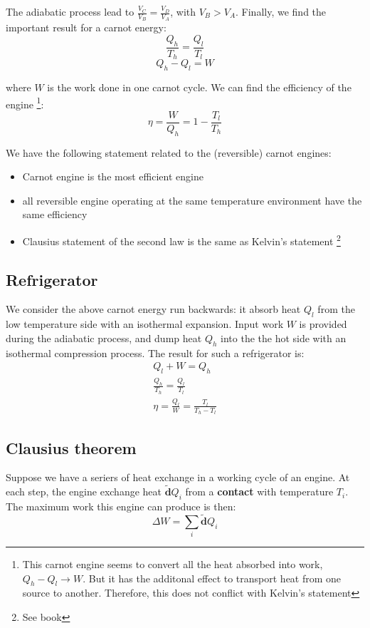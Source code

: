 \documentclass{article}
\newcommand{\dbar}{\mathbf{\tilde{d}}}
\begin{document}
The adiabatic process lead to $\frac{V_C}{V_B} = \frac{V_D}{V_A} $, with $V_B > V_A$. Finally, we 
find the important result for a carnot energy:
\[\boxed{\frac{Q_h}{T_h} = \frac{Q_l}{T_l} }\]
\begin{equation}
    Q_h - Q_l = W 
\end{equation}

where $W$ is the work done in one carnot cycle. We can find the efficiency of the engine
\footnote{This carnot engine seems to convert all the heat absorbed into work, $Q_h - Q_l \to W$. But
it has the additonal effect to transport heat from one source to another. Therefore, this does not 
conflict with Kelvin's statement}:
\begin{equation}
    \eta = \frac{W}{Q_h} = 1 - \frac{T_l}{T_h}
\end{equation}

We have the following statement related to the (reversible) carnot engines:
\begin{itemize}
    \item Carnot engine is the most efficient engine
    \item all reversible engine operating at the same temperature environment have the same efficiency
    \item Clausius statement of the second law is the same as Kelvin's statement \footnote{See book}
\end{itemize}

\subsection{Refrigerator}
We consider the above carnot energy run backwards: it absorb heat $Q_l$ from the 
low temperature side with an isothermal expansion. Input work $W$ is provided 
during the adiabatic process, and dump heat $Q_h$ into the the hot side 
with an isothermal compression process. The result for such a refrigerator is:
\begin{gather}
    Q_l + W = Q_h \\
    \frac{Q_h}{T_h} = \frac{Q_l}{T_l} \\
    \eta = \frac{Q_l}{W} = \frac{T_l}{T_h - T_l}
\end{gather} 

\subsection{Clausius theorem}
Suppose we have a seriers of heat exchange in a working cycle of an engine. At 
each step, the engine exchange heat $\dbar Q_i $ from a \textbf{contact} with 
temperature $T_i$. The maximum work this engine can produce is then:
\begin{equation}
    \Delta W = \sum_i \dbar Q_i
\end{equation}
\end{document}
